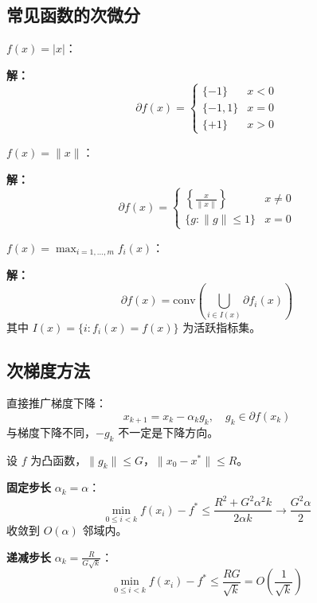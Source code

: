 \subsection{常见函数的次微分}\label{sec:common-subgradients}

\begin{example}[绝对值函数的次微分]
$f(x) = |x|$：

\textbf{解：}
\[
\partial f(x) = \begin{cases} \{-1\} & x < 0 \\ \{-1, 1\} & x = 0 \\ \{+1\} & x > 0 \end{cases}
\]
\end{example}

\begin{example}[欧几里得范数的次微分]
$f(x) = \|x\|$：

\textbf{解：}
\[
\partial f(x) = \begin{cases} \left\{\frac{x}{\|x\|}\right\} & x \neq 0 \\ \{g : \|g\| \leq 1\} & x = 0 \end{cases}
\]
\end{example}

\begin{example}[最大值函数的次微分]
$f(x) = \max_{i=1,\ldots,m} f_i(x)$：

\textbf{解：}
\[
\partial f(x) = \text{conv}\left(\bigcup_{i \in I(x)} \partial f_i(x)\right)
\]
其中 $I(x) = \{i : f_i(x) = f(x)\}$ 为活跃指标集。
\end{example}

\subsection{次梯度方法}\label{sec:subgradient-method}

\begin{conceptbox}[次梯度方法]
直接推广梯度下降：
\[
x_{k+1} = x_k - \alpha_k g_k, \quad g_k \in \partial f(x_k)
\]
与梯度下降不同，$-\!g_k$ 不一定是下降方向。
\end{conceptbox}

\begin{theorem}[次梯度方法的收敛性]
设 $f$ 为凸函数，$\|g_k\| \leq G$，$\|x_0 - x^*\| \leq R$。

\textbf{固定步长} $\alpha_k = \alpha$：
\[
\min_{0 \leq i < k} f(x_i) - f^* \leq \frac{R^2 + G^2 \alpha^2 k}{2\alpha k} \to \frac{G^2 \alpha}{2}
\]
收敛到 $O(\alpha)$ 邻域内。

\textbf{递减步长} $\alpha_k = \frac{R}{G\sqrt{k}}$：
\[
\min_{0 \leq i < k} f(x_i) - f^* \leq \frac{RG}{\sqrt{k}} = O\left(\frac{1}{\sqrt{k}}\right)
\]
\end{theorem}

